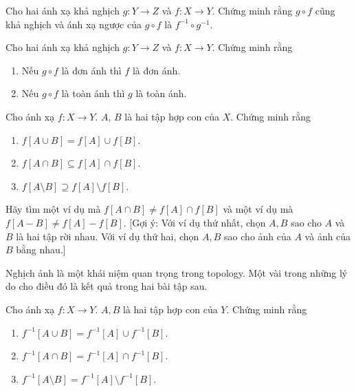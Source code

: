 \begin{exercise}
    Cho hai ánh xạ khả nghịch $g: Y\to Z$ và $f: X\to Y$. Chứng minh rằng $g\circ f$ cũng khả nghịch và ánh xạ ngược của $g\circ f$ là $f^{-1}\circ g^{-1}$.
\end{exercise}

\begin{exercise}
    Cho hai ánh xạ khả nghịch $g: Y\to Z$ và $f: X\to Y$. Chứng minh rằng
    \begin{enumerate}[label={(\roman*)}]
        \item Nếu $g\circ f$ là đơn ánh thì $f$ là đơn ánh.
        \item Nếu $g\circ f$ là toàn ánh thì $g$ là toàn ánh.
    \end{enumerate}
\end{exercise}

\begin{exercise}
    Cho ánh xạ $f: X\to Y$. $A$, $B$ là hai tập hợp con của $X$. Chứng minh rằng
    \begin{enumerate}[label={(\roman*)}]
        \item $f[A\cup B] = f[A]\cup f[B]$.
        \item $f[A\cap B] \subseteq f[A]\cap f[B]$.
        \item $f[A \setminus B] \supseteq f[A] \setminus f[B]$.
    \end{enumerate}

    Hãy tìm một ví dụ mà $f[A\cap B]\ne f[A]\cap f[B]$ và một ví dụ mà $f[A - B]\ne f[A] - f[B]$. [Gợi ý: Với ví dụ thứ nhất, chọn $A, B$ sao cho $A$ và $B$ là hai tập rời nhau. Với ví dụ thứ hai, chọn $A, B$ sao cho ảnh của $A$ và ảnh của $B$ bằng nhau.]
\end{exercise}

Nghịch ảnh là một khái niệm quan trọng trong topology. Một vài trong những lý do cho điều đó là kết quả trong hai bài tập sau.

\begin{exercise}
    Cho ánh xạ $f: X\to Y$. $A, B$ là hai tập hợp con của $Y$. Chứng minh rằng
    \begin{enumerate}[label={(\roman*)}]
        \item $f^{-1}[A\cup B] = f^{-1}[A]\cup f^{-1}[B]$.
        \item $f^{-1}[A\cap B] = f^{-1}[A]\cap f^{-1}[B]$.
        \item $f^{-1}[A \setminus B] = f^{-1}[A] \setminus f^{-1}[B]$.
    \end{enumerate}
\end{exercise}

